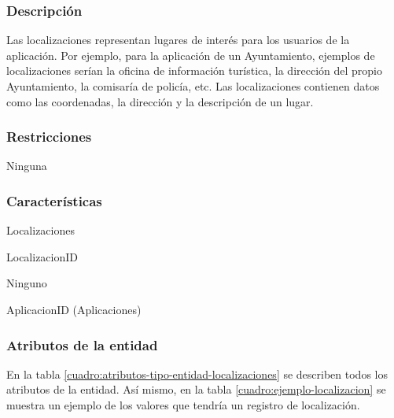 \subsubsection*{Descripción}
Las localizaciones representan lugares de interés para los usuarios de la aplicación. Por ejemplo, para la aplicación de un Ayuntamiento, ejemplos de localizaciones serían la oficina de información turística, la dirección del propio Ayuntamiento, la comisaría de policía, etc. Las localizaciones contienen datos como las coordenadas, la dirección y la descripción de un lugar.

\subsubsection*{Restricciones}
Ninguna

\subsubsection*{Características}
\begin{description}[nosep,style=multiline,labelindent=0.8cm,leftmargin=4.5cm,font=\normalfont]
    \item[Nombre] Localizaciones
    \item[Id. principal] LocalizacionID
    \item[Id. alternativo] Ninguno
    \item[Atrib. heredados] AplicacionID (Aplicaciones)
\end{description}

\subsubsection*{Atributos de la entidad}
En la tabla \ref{cuadro:atributos-tipo-entidad-localizaciones} se describen todos los atributos de la entidad. Así mismo, en la tabla \ref{cuadro:ejemplo-localizacion} se muestra un ejemplo de los valores que tendría un registro de localización.

